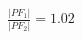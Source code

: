 \documentclass[preview]{standalone}
\begin{document}
\begin{align*}
\frac{|PF_1|}{|PF_2|} = 1.02
\end{align*}
\end{document}
